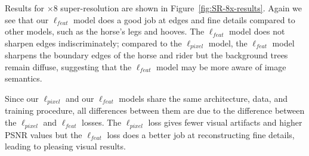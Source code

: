 \documentclass[runningheads]{llncs}
\begin{document}
Results for $\times8$ super-resolution are shown in Figure~\ref{fig:SR-8x-results}. Again we see that
our $\ell_{feat}$ model does a good job at edges and fine details compared to other models,
such as the horse's legs and hooves. The $\ell_{feat}$ model does not sharpen edges
indiscriminately; compared to the $\ell_{pixel}$ model, the $\ell_{feat}$ model sharpens the boundary
edges of the horse and rider but the background trees remain diffuse, suggesting that the
$\ell_{feat}$ model may be more aware of image semantics.

Since our $\ell_{pixel}$ and our $\ell_{feat}$ models share the same architecture,
data, and training procedure, all differences between them are due to the difference between the
$\ell_{pixel}$ and $\ell_{feat}$ losses. The $\ell_{pixel}$ loss gives fewer visual artifacts and
higher PSNR values but the $\ell_{feat}$ loss does a better job at reconstructing fine details, leading
to pleasing visual results.
\end{document}
